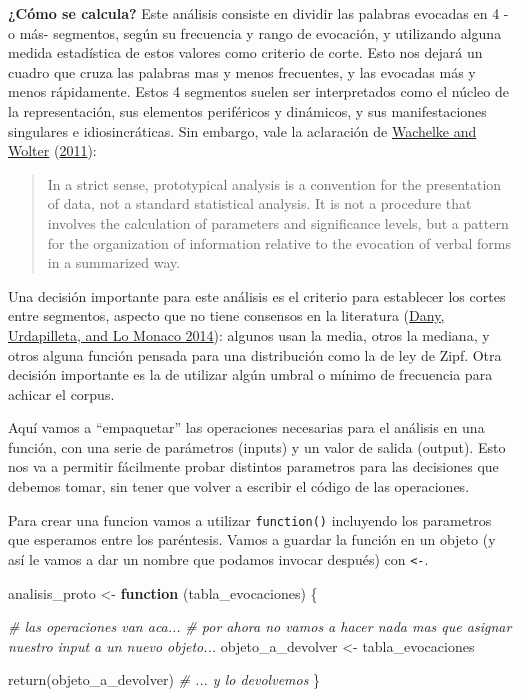 \documentclass[
]{book}
\newenvironment{Shaded}{\begin{snugshade}}{\end{snugshade}}
\newcommand{\CommentTok}[1]{\textcolor[rgb]{0.56,0.35,0.01}{\textit{#1}}}
\newcommand{\ControlFlowTok}[1]{\textcolor[rgb]{0.13,0.29,0.53}{\textbf{#1}}}
\newcommand{\FunctionTok}[1]{\textcolor[rgb]{0.00,0.00,0.00}{#1}}
\newcommand{\NormalTok}[1]{#1}
\newcommand{\OtherTok}[1]{\textcolor[rgb]{0.56,0.35,0.01}{#1}}
\begin{document}
\textbf{¿Cómo se calcula?} Este análisis consiste en dividir las palabras evocadas en 4 -o más- segmentos, según su frecuencia y rango de evocación, y utilizando alguna medida estadística de estos valores como criterio de corte. Esto nos dejará un cuadro que cruza las palabras mas y menos frecuentes, y las evocadas más y menos rápidamente. Estos 4 segmentos suelen ser interpretados como el núcleo de la representación, sus elementos periféricos y dinámicos, y sus manifestaciones singulares e idiosincráticas. Sin embargo, vale la aclaración de \protect\hyperlink{ref-Wachelke2011}{Wachelke and Wolter} (\protect\hyperlink{ref-Wachelke2011}{2011}):

\begin{quote}
In a strict sense, prototypical analysis is a convention for the presentation of data, not a standard statistical analysis. It is not a procedure that involves the calculation of parameters and significance levels, but a pattern for the organization of information relative to the evocation of verbal forms in a summarized way.
\end{quote}

Una decisión importante para este análisis es el criterio para establecer los cortes entre segmentos, aspecto que no tiene consensos en la literatura (\protect\hyperlink{ref-Dany2014}{Dany, Urdapilleta, and Lo Monaco 2014}): algunos usan la media, otros la mediana, y otros alguna función pensada para una distribución como la de ley de Zipf. Otra decisión importante es la de utilizar algún umbral o mínimo de frecuencia para achicar el corpus.

Aquí vamos a ``empaquetar'' las operaciones necesarias para el análisis en una función, con una serie de parámetros (inputs) y un valor de salida (output). Esto nos va a permitir fácilmente probar distintos parametros para las decisiones que debemos tomar, sin tener que volver a escribir el código de las operaciones.

Para crear una funcion vamos a utilizar \texttt{function()} incluyendo los parametros que esperamos entre los paréntesis. Vamos a guardar la función en un objeto (y así le vamos a dar un nombre que podamos invocar después) con \texttt{\textless{}-}.

\begin{Shaded}
\begin{Highlighting}[]
\NormalTok{analisis\_proto }\OtherTok{\textless{}{-}} \ControlFlowTok{function}\NormalTok{ (tabla\_evocaciones) \{}
  
  \CommentTok{\# las operaciones van aca...}
  \CommentTok{\# por ahora no vamos a hacer nada mas que asignar nuestro input a un nuevo objeto...}
\NormalTok{  objeto\_a\_devolver }\OtherTok{\textless{}{-}}\NormalTok{ tabla\_evocaciones }
  
  \FunctionTok{return}\NormalTok{(objeto\_a\_devolver) }\CommentTok{\# ... y lo devolvemos}
\NormalTok{\}}
\end{Highlighting}
\end{Shaded}
\end{document}
